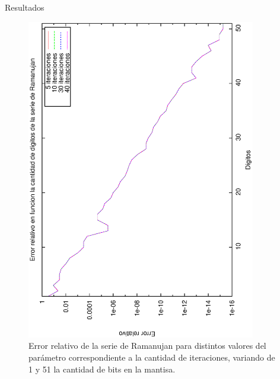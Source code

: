 \begin{section}{Resultados}
	\begin{figure}[H]
	  \centering
		\includegraphics[width=10cm,angle=-90]{graficos/ramanujan_1a51p.eps}
	  \caption{Error relativo de la serie de Ramanujan para distintos valores del parámetro correspondiente a la cantidad de iteraciones, variando de 1 y 51 la cantidad de bits en la mantisa.}
	  \label{fig:ramanujan_51p}
	\end{figure}
	
	\VSP


\end{section}
